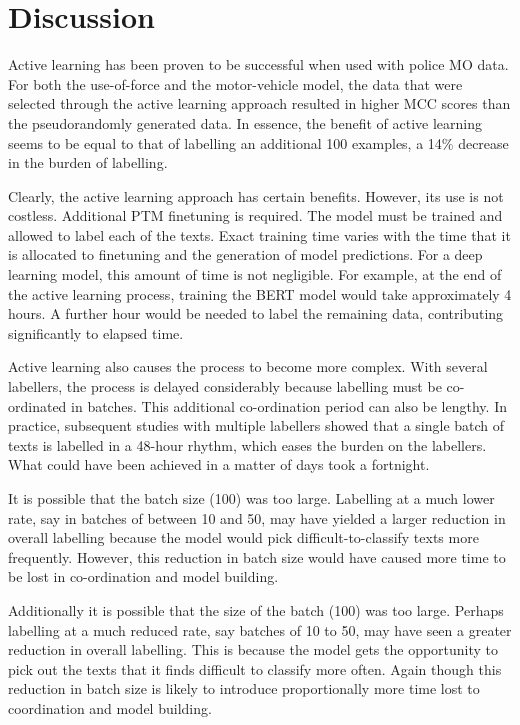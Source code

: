 \section{Discussion} Active learning has been proven to be successful when used with police MO data. For both the use-of-force and the motor-vehicle model, the data that were selected through the active learning approach resulted in higher MCC scores than the pseudorandomly generated data. In essence, the benefit of active learning seems to be equal to that of labelling an additional 100 examples, a 14\% decrease in the burden of labelling.

Clearly, the active learning approach has certain benefits. However, its use is not costless. Additional PTM finetuning is required. The model must be trained and allowed to label each of the texts. Exact training time varies with the time that it is allocated to finetuning and the generation of model predictions. For a deep learning model, this amount of time is not negligible. For example, at the end of the active learning process, training the BERT model would take approximately 4 hours. A further hour would be needed to label the remaining data, contributing significantly to elapsed time.

Active learning also causes the process to become more complex. With several labellers, the process is delayed considerably because labelling must be co-ordinated in batches. This additional co-ordination period can also be lengthy. In practice, subsequent studies with multiple labellers showed that a single batch of texts is labelled in a 48-hour rhythm, which eases the burden on the labellers. What could have been achieved in a matter of days took a fortnight.

It is possible that the batch size (100) was too large. Labelling at a much lower rate, say in batches of between 10 and 50, may have yielded a larger reduction in overall labelling because the model would pick difficult-to-classify texts more frequently. However, this reduction in batch size would have caused more time to be lost in co-ordination and model building.

Additionally it is possible that the size of the batch (100) was too large. Perhaps labelling at a much reduced rate, say batches of 10 to 50, may have seen a greater reduction in overall labelling. This is because the model gets the opportunity to pick out the texts that it finds difficult to classify more often. Again though this reduction in batch size is likely to introduce proportionally more time lost to coordination and model building.

